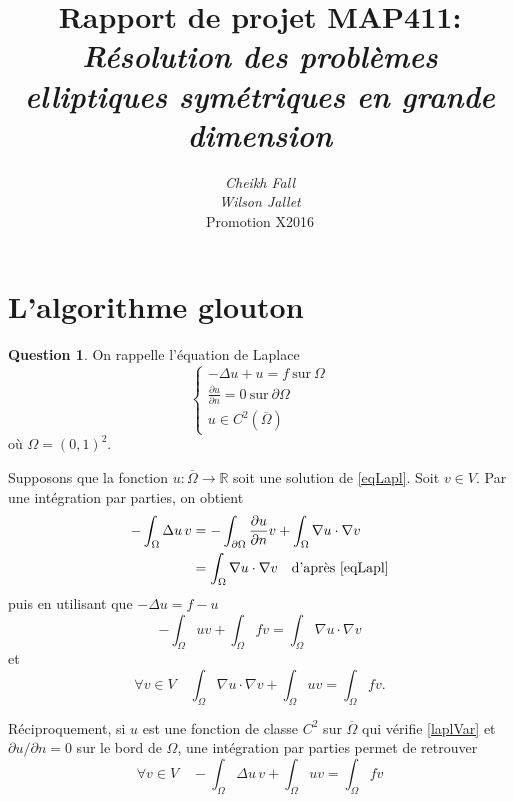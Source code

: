 \documentclass[11pt]{article}
\title{
	\textbf{Rapport de projet MAP411}:\\
	\textit{Résolution des problèmes elliptiques symétriques en grande dimension}}
\author{
	\textit{Cheikh Fall}\\
	\textit{Wilson Jallet}\\
Promotion X2016}
\newcommand{\RR}{\mathbb{R}}
\theoremstyle{definition}
\newtheorem{ques}{Question}
\begin{document}
\maketitle

\section{L'algorithme glouton}

\begin{ques}
On rappelle l'équation de Laplace
\begin{equation}\label{eqLapl}
\left\{
\begin{array}{l}
-\Delta u + u = f\ \text{sur}\ \Omega \\
\frac{\partial u}{\partial n} = 0\ \text{sur}\ \partial\Omega \\
u \in C^2(\overline{\Omega})
\end{array}
\right.
\end{equation}
où $\Omega = (0,1)^2$.

Supposons que la fonction $u:\overline\Omega\longrightarrow\RR$ soit une solution de \eqref{eqLapl}. Soit $v\in V$. Par une intégration par parties, on obtient
\begin{align*}
-\int_\Omega \Delta u\, v &= -\int_{\partial\Omega} \frac{\partial u}{\partial n}v + \int_\Omega \nabla u\cdot \nabla v \\
&= \int_\Omega \nabla u\cdot \nabla v \quad \text{d'après \eqref{eqLapl}}
\end{align*}
puis en utilisant que $-\Delta u = f-u$
\[
	-\int_\Omega uv + \int_\Omega fv = \int_\Omega \nabla u\cdot \nabla v
\]
et
\begin{equation}\label{laplVar}
\forall v\in V\quad
\int_\Omega \nabla u\cdot \nabla v + \int_\Omega uv = \int_\Omega fv.
\end{equation}


Réciproquement, si $u$ est une fonction de classe $C^2$ sur $\overline\Omega$ qui vérifie \eqref{laplVar} et $\partial u/\partial n = 0$ sur le bord de $\Omega$, une intégration par parties permet de retrouver 
\[
\forall v\in V\quad  -\int_\Omega \Delta u\, v + \int_\Omega uv = \int_\Omega fv
\]


\end{ques}
\end{document}
